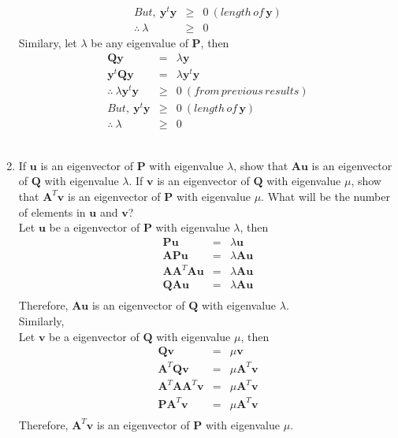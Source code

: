 \documentclass[11pt]{article}
\begin{document}
\begin{enumerate}
\begin{eqnarray*}
But,\:\mathbf{y}^t \mathbf{y} &\geq& 0\:(length\,of\,\mathbf{y}) \\
\therefore\:\lambda &\geq& 0
\end{eqnarray*}
Similary, let $\lambda$ be any eigenvalue of $\mathbf{P}$, then
\begin{eqnarray*}
\mathbf{Qy} &=& \lambda \mathbf{y} \\
\mathbf{y}^t \mathbf{Qy} &=& \lambda  \mathbf{y}^t \mathbf{y} \\
\therefore\:\lambda  \mathbf{y}^t \mathbf{y} &\geq& 0 \:(from\,previous\,results)\\
But,\:\mathbf{y}^t \mathbf{y} &\geq& 0\:(length\,of\,\mathbf{y}) \\
\therefore\:\lambda &\geq& 0
\end{eqnarray*}
\\
\item If $\mathbf{u}$ is an eigenvector of $\mathbf{P}$ with eigenvalue $\lambda$, show that $\mathbf{Au}$ is an eigenvector of $\mathbf{Q}$ with eigenvalue $\lambda$. If $\mathbf{v}$ is an eigenvector of $\mathbf{Q}$ with eigenvalue $\mu$, show that $\mathbf{A}^T\mathbf{v}$ is an eigenvector of $\mathbf{P}$ with eigenvalue $\mu$. What will be the number of elements in $\mathbf{u}$ and $\mathbf{v}$?\\
Let $\mathbf{u}$ be a eigenvector of $\mathbf{P}$ with eigenvalue $\lambda$, then
\begin{eqnarray*}
\mathbf{Pu} &=& \lambda \mathbf{u} \\
\mathbf{APu} &=& \lambda \mathbf{Au}\\
\mathbf{AA}^T\mathbf{Au} &=& \lambda \mathbf{Au}\\
\mathbf{QAu} &=& \lambda \mathbf{Au} \\
\end{eqnarray*}
Therefore, 
$\mathbf{Au}$ is an eigenvector of $\mathbf{Q}$ with eigenvalue $\lambda$. \\

Similarly,\\
Let $\mathbf{v}$ be a eigenvector of $\mathbf{Q}$ with eigenvalue $\mu$, then
\begin{eqnarray*}
\mathbf{Qv} &=& \mu \mathbf{v} \\
\mathbf{A}^T\mathbf{Qv} &=& \mu \mathbf{A}^T\mathbf{v}\\
\mathbf{A}^T\mathbf{AA}^T\mathbf{v} &=& \mu \mathbf{A}^T\mathbf{v}\\
\mathbf{PA}^T\mathbf{v} &=& \mu \mathbf{A}^T\mathbf{v} \\
\end{eqnarray*}
Therefore, 
$\mathbf{A}^T\mathbf{v}$ is an eigenvector of $\mathbf{P}$ with eigenvalue $\mu$. \\


\end{enumerate}
\end{document}
